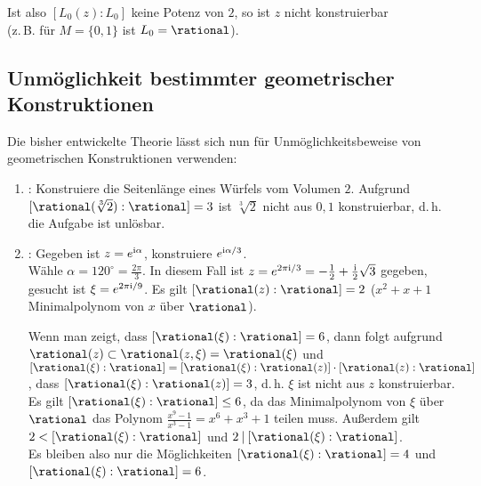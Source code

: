 \begin{Bem}
    Ist also $[L_0(z):L_0]$ keine Potenz von $2$, so ist $z$ nicht
    konstruierbar\\
    (z.\,B. für $M = \{0, 1\}$ ist $L_0 = \rational$).
\end{Bem}

\pagebreak

\subsection{%
    Unmöglichkeit bestimmter geometrischer Konstruktionen%
}

\begin{Bem}
    Die bisher entwickelte Theorie lässt sich nun für
    Unmöglichkeitsbeweise von geometrischen Konstruktionen verwenden:
    \begin{enumerate}
        \item
        :
        Konstruiere die Seitenlänge eines Würfels vom Volumen $2$.
        Aufgrund $[\rational(\sqrt[3]{2}):\rational] = 3$ ist
        $\sqrt[3]{2}$ nicht aus $0, 1$ konstruierbar, d.\,h.
        die Aufgabe ist unlösbar.
        
        \item
        :
        Gegeben ist $z = e^{\text{i}\alpha}$, konstruiere $e^{\text{i}\alpha/3}$.\\
        Wähle $\alpha = 120^\circ = \frac{2\pi}{3}$.
        In diesem Fall ist
        $z = e^{2\pi\text{i}/3} = -\frac{1}{2} + \frac{\text{i}}{2} \sqrt{3}$ gegeben,
        gesucht ist $\xi = e^{2\pi\text{i}/9}$.
        Es gilt $[\rational(z):\rational] = 2$
        ($x^2 + x + 1$ Minimalpolynom von $x$ über $\rational$).
        
        Wenn man zeigt, dass $[\rational(\xi):\rational] = 6$,
        dann folgt aufgrund
        $\rational(z) \subset \rational(z, \xi) = \rational(\xi)$ und\\
        $[\rational(\xi):\rational] =
        [\rational(\xi):\rational(z)] \cdot [\rational(z):\rational]$,
        dass $[\rational(\xi):\rational(z)] = 3$,
        d.\,h. $\xi$ ist nicht aus $z$ konstruierbar.
        Es gilt $[\rational(\xi):\rational] \le 6$, da
        das Minimalpolynom von $\xi$ über $\rational$
        das Polynom $\frac{x^9 - 1}{x^3 - 1} = x^6 + x^3 + 1$ teilen muss.
        Außerdem gilt $2 < [\rational(\xi):\rational]$
        und $2 \teilt [\rational(\xi):\rational]$.\\
        Es bleiben also nur die Möglichkeiten
        $[\rational(\xi):\rational] = 4$ und
        $[\rational(\xi):\rational] = 6$.
        

\end{enumerate}
\end{Bem}
